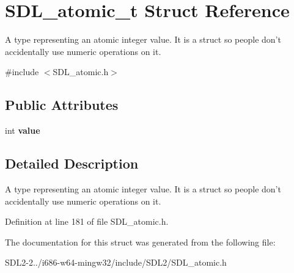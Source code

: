 \hypertarget{structSDL__atomic__t}{\section{S\+D\+L\+\_\+atomic\+\_\+t Struct Reference}
\label{structSDL__atomic__t}
}


A type representing an atomic integer value. It is a struct so people don't accidentally use numeric operations on it.  




{\ttfamily \#include $<$S\+D\+L\+\_\+atomic.\+h$>$}

\subsection*{Public Attributes}
\begin{DoxyCompactItemize}
\item 
\hypertarget{structSDL__atomic__t_a0d09ddf3cc5798c709edb7cea104203a}{int {\bfseries value}}\label{structSDL__atomic__t_a0d09ddf3cc5798c709edb7cea104203a}

\end{DoxyCompactItemize}


\subsection{Detailed Description}
A type representing an atomic integer value. It is a struct so people don't accidentally use numeric operations on it. 

Definition at line 181 of file S\+D\+L\+\_\+atomic.\+h.



The documentation for this struct was generated from the following file\+:\begin{DoxyCompactItemize}
\item 
S\+D\+L2-\/2../i686-\/w64-\/mingw32/include/\+S\+D\+L2/S\+D\+L\+\_\+atomic.\+h\end{DoxyCompactItemize}
